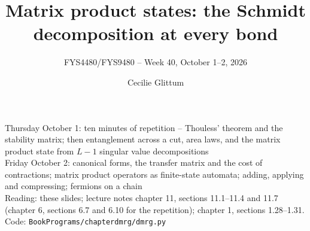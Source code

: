 \documentclass[aspectratio=169,10pt]{beamer}
\title{Matrix product states: the Schmidt decomposition at every bond}
\subtitle{FYS4480/FYS9480 -- Week 40, October 1--2, 2026}
\author{Cecilie Glittum}
\institute{Department of Physics,\\
University of Oslo, Norway}
\date{}
\begin{document}
\begin{frame}[plain]
  \vfill
  \begin{center}\scriptsize
  Thursday October 1: ten minutes of repetition -- Thouless' theorem and the stability matrix; then entanglement across a cut, area laws, and the matrix product state from $L-1$ singular value decompositions\\
  Friday October 2: canonical forms, the transfer matrix and the cost of contractions; matrix product operators as finite-state automata; adding, applying and compressing; fermions on a chain\\[0.2em]
  Reading: these slides; lecture notes chapter 11, sections 11.1--11.4 and 11.7 (chapter 6, sections 6.7 and 6.10 for the repetition); chapter 1, sections 1.28--1.31. Code: \texttt{BookPrograms/chapterdmrg/dmrg.py}\\[0.4em]
  \end{center}
\end{frame}
\end{document}
